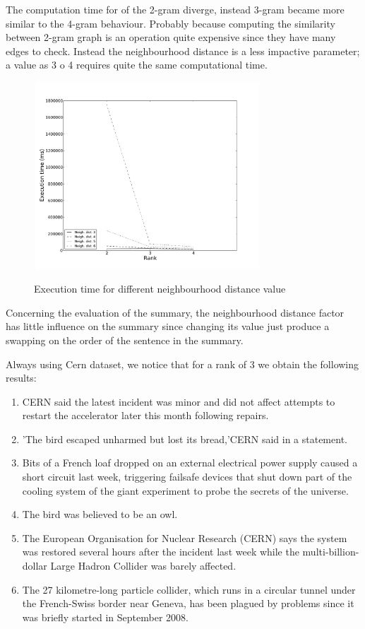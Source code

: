 The computation time for of the 2-gram diverge, instead 3-gram became more similar to the 4-gram behaviour. 
Probably because computing the similarity between 2-gram graph is an operation quite expensive since they have many edges to check.
Instead the neighbourhood distance is a less impactive parameter; a value as 3 o 4 requires quite the same computational time.

\begin{figure}[htbp]
	\centering
			{\includegraphics[width=8.5cm,height=7cm]{image/win_2_ndists.pdf}}	
					\caption[et-fixed-10days-r-nd]{Execution time for different neighbourhood distance value}
	\label{fig:et-fixed-10days-r-nd}
\end{figure} 

Concerning the evaluation of the summary, the neighbourhood distance factor has little influence on the summary since changing its value just produce a swapping on the order of the sentence in the summary.

Always using Cern dataset, we notice that for a rank of 3 we obtain the following results:

\begin{enumerate}
	\item CERN said the latest incident was minor and did not affect attempts to restart the accelerator later this month following repairs.
	\item 'The bird escaped unharmed but lost its bread,'CERN said in a statement.
	\item Bits of a French loaf dropped on an external electrical power supply caused a short circuit last week, triggering failsafe devices that shut down part of the cooling system of the giant experiment to probe the secrets of the universe.
	\item The bird was believed to be an owl.
	\item The European Organisation for Nuclear Research (CERN) says the system was restored several hours after the incident last week while the multi-billion-dollar Large Hadron Collider was barely affected.
	\item The 27 kilometre-long particle collider, which runs in a circular tunnel under the French-Swiss border near Geneva, has been plagued by problems since it was briefly started in September 2008.
\end{enumerate}

